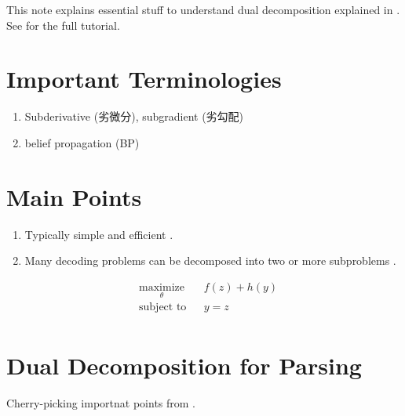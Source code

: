 \documentclass[11pt]{article}
\begin{document}
This note explains essential stuff to understand dual decomposition explained in \cite{pfi_dual_decomposition}. 
See \cite{Rush_2012_tutorial} for the full tutorial.

\section{Important Terminologies}
\begin{enumerate}
 \item Subderivative (劣微分), subgradient (劣勾配)
 \item belief propagation (BP)
\end{enumerate}

\section{Main Points}
\begin{enumerate}
 \item Typically simple and efficient \cite{Rush_2012_tutorial}.
 \item Many decoding problems can be decomposed into two or more subproblems \cite{Rush_2012_tutorial}.
\end{enumerate}

\begin{equation*}
\begin{aligned}
& \underset{\theta}{\text{maximize}}
& & f(z) + h(y) \\
& \text{subject to}
& & y = z \\
\end{aligned}
\end{equation*}

\section{Dual Decomposition for Parsing}
Cherry-picking importnat points from \cite{Rush_2012_tutorial}.



\end{document}
